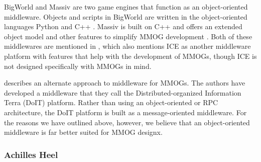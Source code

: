 \documentclass{acm_proc_article-sp}
\begin{document}

BigWorld and Massiv  are two game engines that function as an object-oriented middleware.  Objects and scripts in BigWorld are written in the object-oriented languages Python and C++ \cite{bigworldtech}.  Massiv is built on C++ and offers an extended object model and other features to simplify MMOG development \cite{massiv}. Both of these middlewares are mentioned in \cite{Hsiao:2005p8709}, which also mentions ICE as another middleware platform with features that help with the development of MMOGs, though ICE is not designed specifically with MMOGs in mind.



\cite{Hsiao:2005p8709} describes an alternate approach to middleware for MMOGs.  The authors have developed a middleware that they call the Distributed-organized Information Terra (DoIT) platform.  Rather than using an object-oriented or RPC architecture, the DoIT platform is built as a message-oriented middleware. For the reasons we have outlined above, however, we believe that an object-oriented middleware is far better suited for MMOG designx.


\subsubsection{Achilles Heel}
\label{sec:appsobjbad}
\end{document}
